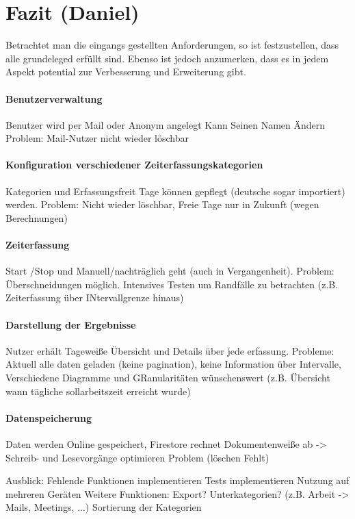 \section{Fazit (Daniel)}\label{sec:fazit}
Betrachtet man die eingangs gestellten Anforderungen,
so ist festzustellen, dass alle grundeleged erfüllt sind.
Ebenso ist jedoch anzumerken, dass es in jedem Aspekt potential zur Verbesserung und Erweiterung gibt.

\paragraph{Benutzerverwaltung}
Benutzer wird per Mail oder Anonym angelegt
Kann Seinen Namen Ändern
Problem: Mail-Nutzer nicht wieder löschbar

\paragraph{Konfiguration verschiedener Zeiterfassungskategorien}
Kategorien und Erfassungsfreit Tage können gepflegt (deutsche sogar importiert) werden.
Problem: Nicht wieder löschbar, Freie Tage nur in Zukunft (wegen Berechnungen)

\paragraph{Zeiterfassung}
Start /Stop und Manuell/nachträglich geht (auch in Vergangenheit).
Problem: Überschneidungen möglich. Intensives Testen um Randfälle zu betrachten (z.B. Zeiterfassung über INtervallgrenze hinaus)

\paragraph{Darstellung der Ergebnisse}
Nutzer erhält Tageweiße Übersicht und Details über jede erfassung.
Probleme: Aktuell alle daten geladen (keine pagination), keine Information über Intervalle,
Verschiedene Diagramme und GRanularitäten wünschenswert (z.B. Übersicht wann tägliche sollarbeitszeit erreicht wurde)

\paragraph{Datenspeicherung}
Daten werden Online gespeichert,
Firestore rechnet Dokumentenweiße ab -> Schreib- und Lesevorgänge optimieren
Problem (löschen Fehlt)


Ausblick:
Fehlende Funktionen implementieren
Tests implementieren
Nutzung auf mehreren Geräten
Weitere Funktionen:
    Export?
    Unterkategorien? (z.B. Arbeit -> Mails, Meetings, ...)
    Sortierung der Kategorien

